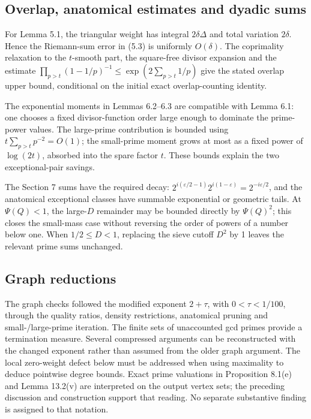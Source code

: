 \documentclass[10pt]{article}
\begin{document}
\subsection*{Overlap, anatomical estimates and dyadic sums}
For Lemma 5.1, the triangular weight has integral \(2\delta\Delta\) and total variation \(2\delta\). Hence the Riemann-sum error in (5.3) is uniformly \(O(\delta)\). The coprimality relaxation to the \(t\)-smooth part, the square-free divisor expansion and the estimate \(\prod_{p>t}(1-1/p)^{-1}\leq
\exp(2\sum_{p>t}1/p)\) give the stated overlap upper bound, conditional on the initial exact overlap-counting identity.\par
The exponential moments in Lemmas 6.2–6.3 are compatible with Lemma 6.1: one chooses a fixed divisor-function order large enough to dominate the prime-power values. The large-prime contribution is bounded using \(t\sum_{p>t}p^{-2}=O(1)\); the small-prime moment grows at most as a fixed power of \(\log(2t)\), absorbed into the spare factor \(t\). These bounds explain the two exceptional-pair savings.\par
The Section 7 sums have the required decay: \(2^{i(\varepsilon/2-1)}2^{i(1-\varepsilon)}
=2^{-i\varepsilon/2}\), and the anatomical exceptional classes have summable exponential or geometric tails. At \(\Psi(Q)<1\), the large-\(D\) remainder may be bounded directly by \(\Psi(Q)^2\); this closes the small-mass case without reversing the order of powers of a number below one. When \(1/2\leq D<1\), replacing the sieve cutoff \(D^2\) by 1 leaves the relevant prime sums unchanged.\par
\subsection*{Graph reductions}
The graph checks followed the modified exponent \(2+\tau\), with \(0<\tau<1/100\), through the quality ratios, density restrictions, anatomical pruning and small-/large-prime iteration. The finite sets of unaccounted gcd primes provide a termination measure. Several compressed arguments can be reconstructed with the changed exponent rather than assumed from the older graph argument. The local zero-weight defect below must be addressed when using maximality to deduce pointwise degree bounds. Exact prime valuations in Proposition 8.1(e) and Lemma 13.2(v) are interpreted on the output vertex sets; the preceding discussion and construction support that reading. No separate substantive finding is assigned to that notation.\par
\end{document}
